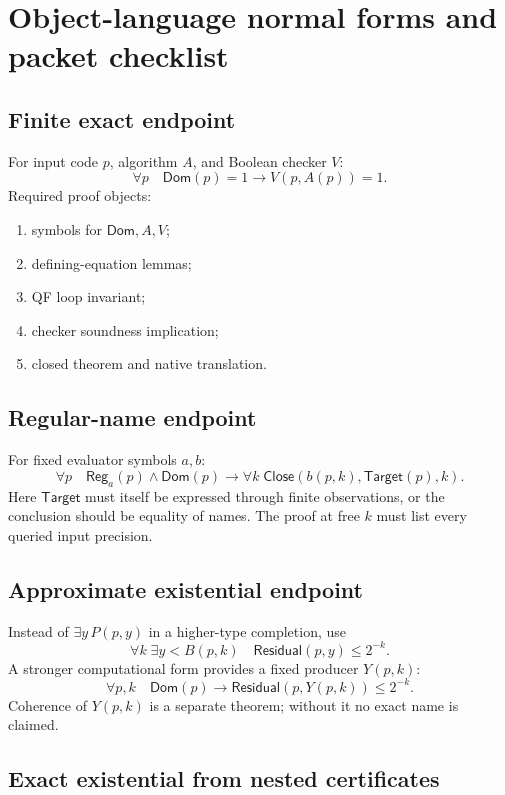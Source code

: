 \section{Object-language normal forms and packet checklist}
\label{app:normal-forms}

\subsection{Finite exact endpoint}

For input code \(p\), algorithm \(A\), and Boolean checker \(V\):
\[
 \forall p\quad \mathsf{Dom}(p)=1\to V(p,A(p))=1.
\]
Required proof objects:
\begin{enumerate}
\item {} symbols for \(\mathsf{Dom},A,V\);
\item defining-equation lemmas;
\item QF loop invariant;
\item checker soundness implication;
\item closed  theorem and native translation.
\end{enumerate}

\subsection{Regular-name endpoint}

For fixed evaluator symbols \(a,b\):
\[
 \forall p\quad
 \mathsf{Reg}_a(p)\wedge\mathsf{Dom}(p)
 \to \forall k\;\mathsf{Close}(b(p,k),\mathsf{Target}(p),k).
\]
Here \(\mathsf{Target}\) must itself be expressed through finite observations,
or the conclusion should be equality of names.  The proof at free \(k\) must
list every queried input precision.

\subsection{Approximate existential endpoint}

Instead of \(\exists y\,P(p,y)\) in a higher-type completion, use
\[
 \forall k\;\exists y<B(p,k)\quad
 \mathsf{Residual}(p,y)\le2^{-k}.
\]
A stronger computational form provides a fixed producer \(Y(p,k)\):
\[
 \forall p,k\quad
 \mathsf{Dom}(p)\to
 \mathsf{Residual}(p,Y(p,k))\le2^{-k}.
\]
Coherence of \(Y(p,k)\) is a separate theorem; without it no exact name is
claimed.

\subsection{Exact existential from nested certificates}

